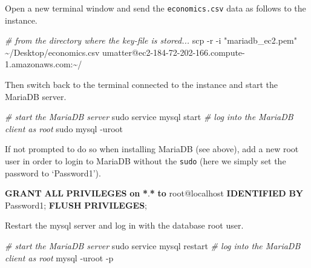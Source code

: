 \documentclass[
  12pt,
]{style/krantz}
\newenvironment{Shaded}{\begin{snugshade}}{\end{snugshade}}
\newcommand{\AttributeTok}[1]{\textcolor[rgb]{0.77,0.63,0.00}{#1}}
\newcommand{\CommentTok}[1]{\textcolor[rgb]{0.56,0.35,0.01}{\textit{#1}}}
\newcommand{\ExtensionTok}[1]{#1}
\newcommand{\FunctionTok}[1]{\textcolor[rgb]{0.00,0.00,0.00}{#1}}
\newcommand{\KeywordTok}[1]{\textcolor[rgb]{0.13,0.29,0.53}{\textbf{#1}}}
\newcommand{\NormalTok}[1]{#1}
\newcommand{\OperatorTok}[1]{\textcolor[rgb]{0.81,0.36,0.00}{\textbf{#1}}}
\newcommand{\StringTok}[1]{\textcolor[rgb]{0.31,0.60,0.02}{#1}}
\begin{document}
Open a new terminal window and send the \texttt{economics.csv} data as follows to the instance.

\begin{Shaded}
\begin{Highlighting}[]
\CommentTok{\# from the directory where the key{-}file is stored...}
\FunctionTok{scp} \AttributeTok{{-}r} \AttributeTok{{-}i} \StringTok{"mariadb\_ec2.pem"}\NormalTok{ \textasciitilde{}/Desktop/economics.csv umatter@ec2{-}184{-}72{-}202{-}166.compute{-}1.amazonaws.com:\textasciitilde{}/}
\end{Highlighting}
\end{Shaded}

Then switch back to the terminal connected to the instance and start the MariaDB server.

\begin{Shaded}
\begin{Highlighting}[]
\CommentTok{\# start the MariaDB server}
\FunctionTok{sudo}\NormalTok{ service mysql start}
\CommentTok{\# log into the MariaDB client as root }
\FunctionTok{sudo}\NormalTok{ mysql }\AttributeTok{{-}uroot} 
\end{Highlighting}
\end{Shaded}

If not prompted to do so when installing MariaDB (see above), add a new root user in order to login to MariaDB without the \texttt{sudo} (here we simply set the password to `Password1').

\begin{Shaded}
\begin{Highlighting}[]
\KeywordTok{GRANT} \KeywordTok{ALL} \KeywordTok{PRIVILEGES} \KeywordTok{on} \OperatorTok{*}\NormalTok{.}\OperatorTok{*} \KeywordTok{to} \StringTok{\textquotesingle{}root\textquotesingle{}}\NormalTok{@}\StringTok{\textquotesingle{}localhost\textquotesingle{}} \KeywordTok{IDENTIFIED} \KeywordTok{BY} \StringTok{\textquotesingle{}Password1\textquotesingle{}}\NormalTok{;}
\KeywordTok{FLUSH} \KeywordTok{PRIVILEGES}\NormalTok{;}
\end{Highlighting}
\end{Shaded}

Restart the mysql server and log in with the database root user.

\begin{Shaded}
\begin{Highlighting}[]
\CommentTok{\# start the MariaDB server}
\FunctionTok{sudo}\NormalTok{ service mysql restart}
\CommentTok{\# log into the MariaDB client as root }
\ExtensionTok{mysql} \AttributeTok{{-}uroot} \AttributeTok{{-}p}
\end{Highlighting}
\end{Shaded}
\end{document}
